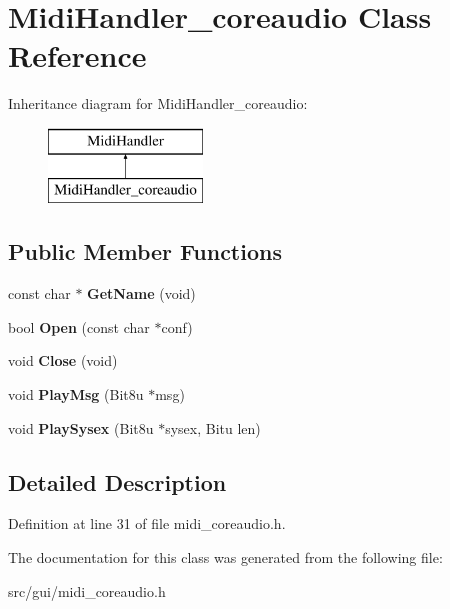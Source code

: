 \hypertarget{classMidiHandler__coreaudio}{\section{Midi\-Handler\-\_\-coreaudio Class Reference}
\label{classMidiHandler__coreaudio}
}
Inheritance diagram for Midi\-Handler\-\_\-coreaudio\-:\begin{figure}[H]
\begin{center}
\leavevmode
\includegraphics[height=2.000000cm]{classMidiHandler__coreaudio}
\end{center}
\end{figure}
\subsection*{Public Member Functions}
\begin{DoxyCompactItemize}
\item 
\hypertarget{classMidiHandler__coreaudio_a9b23b25b48ccc4731518bc80e7aea47b}{const char $\ast$ {\bfseries Get\-Name} (void)}\label{classMidiHandler__coreaudio_a9b23b25b48ccc4731518bc80e7aea47b}

\item 
\hypertarget{classMidiHandler__coreaudio_af829f7f514638c6aa7ff8177071ec66b}{bool {\bfseries Open} (const char $\ast$conf)}\label{classMidiHandler__coreaudio_af829f7f514638c6aa7ff8177071ec66b}

\item 
\hypertarget{classMidiHandler__coreaudio_aea1001d40f3aae55e3265086c8461bfa}{void {\bfseries Close} (void)}\label{classMidiHandler__coreaudio_aea1001d40f3aae55e3265086c8461bfa}

\item 
\hypertarget{classMidiHandler__coreaudio_a414def0cab06f4205c3d1affab2d94b3}{void {\bfseries Play\-Msg} (Bit8u $\ast$msg)}\label{classMidiHandler__coreaudio_a414def0cab06f4205c3d1affab2d94b3}

\item 
\hypertarget{classMidiHandler__coreaudio_a201c3fd877b130d6fa5c01c9a123a2e6}{void {\bfseries Play\-Sysex} (Bit8u $\ast$sysex, Bitu len)}\label{classMidiHandler__coreaudio_a201c3fd877b130d6fa5c01c9a123a2e6}

\end{DoxyCompactItemize}


\subsection{Detailed Description}


Definition at line 31 of file midi\-\_\-coreaudio.\-h.



The documentation for this class was generated from the following file\-:\begin{DoxyCompactItemize}
\item 
src/gui/midi\-\_\-coreaudio.\-h\end{DoxyCompactItemize}

